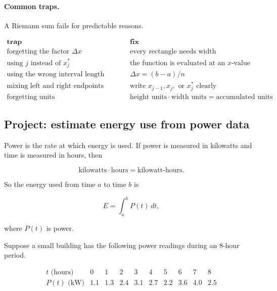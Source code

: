 \paragraph{Common traps.}
A Riemann sum fails for predictable reasons.

\[
\begin{array}{c|c}
\textbf{trap} & \textbf{fix} \\ \hline
\text{forgetting the factor }\Delta x
&
\text{every rectangle needs width}
\\[1mm]
\text{using }j\text{ instead of }x_j^*
&
\text{the function is evaluated at an }x\text{-value}
\\[1mm]
\text{using the wrong interval length}
&
\Delta x=(b-a)/n
\\[1mm]
\text{mixing left and right endpoints unintentionally}
&
\text{write }x_{j-1},x_j,\text{ or }x_j^*\text{ clearly}
\\[1mm]
\text{forgetting units}
&
\text{height units}\cdot\text{width units}=\text{accumulated units}
\end{array}
\]

\subsection{Project: estimate energy use from power data}
\label{subsec:project-estimate-energy-power-data}

Power is the rate at which energy is used.  If power is measured in kilowatts and time
is measured in hours, then

\[
\text{kilowatts}\cdot\text{hours}=\text{kilowatt-hours}.
\]

So the energy used from time \(a\) to time \(b\) is

\[
E=\int_a^b P(t)\,dt,
\]

where \(P(t)\) is power.

Suppose a small building has the following power readings during an \(8\)-hour period.

\[
\begin{array}{c|ccccccccc}
t\text{ (hours)} & 0 & 1 & 2 & 3 & 4 & 5 & 6 & 7 & 8 \\ \hline
P(t)\text{ (kW)} & 1.1 & 1.3 & 2.4 & 3.1 & 2.7 & 2.2 & 3.6 & 4.0 & 2.5
\end{array}
\]

